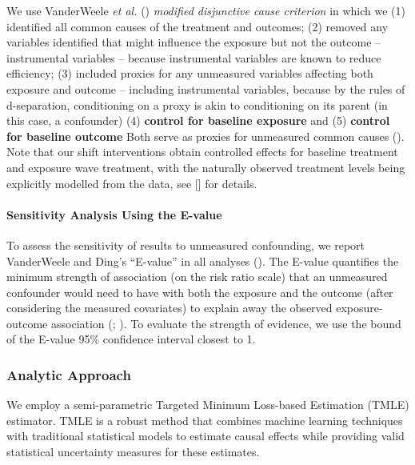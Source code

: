 \documentclass[
  single column]{article}
\let\oldparagraph\paragraph
\renewcommand{\paragraph}[1]{\oldparagraph{#1}\mbox{}}
\begin{document}
We use VanderWeele \emph{et al.} ()
\emph{modified disjunctive cause criterion} in which we (1) identified
all common causes of the treatment and outcomes; (2) removed any
variables identified that might influence the exposure but not the
outcome -- instrumental variables -- because instrumental variables are
known to reduce efficiency; (3) included proxies for any unmeasured
variables affecting both exposure and outcome -- including instrumental
variables, because by the rules of d-separation, conditioning on a proxy
is akin to conditioning on its parent (in this case, a confounder) (4)
\textbf{control for baseline exposure} and (5) \textbf{control for
baseline outcome} Both serve as proxies for unmeasured common causes
(). Note
that our shift interventions obtain controlled effects for baseline
treatment and exposure wave treatment, with the naturally observed
treatment levels being explicitly modelled from the data, see {[}{]} for
details.

\paragraph{Sensitivity Analysis Using the
E-value}\label{sensitivity-analysis-using-the-e-value}

To assess the sensitivity of results to unmeasured confounding, we
report VanderWeele and Ding's ``E-value'' in all analyses
(). The E-value
quantifies the minimum strength of association (on the risk ratio scale)
that an unmeasured confounder would need to have with both the exposure
and the outcome (after considering the measured covariates) to explain
away the observed exposure-outcome association
(;
). To
evaluate the strength of evidence, we use the bound of the E-value 95\%
confidence interval closest to 1.

\subsubsection{Analytic Approach}\label{analytic-approach}

We employ a semi-parametric Targeted Minimum Loss-based Estimation
(TMLE) estimator. TMLE is a robust method that combines machine learning
techniques with traditional statistical models to estimate causal
effects while providing valid statistical uncertainty measures for these
estimates.
\end{document}
